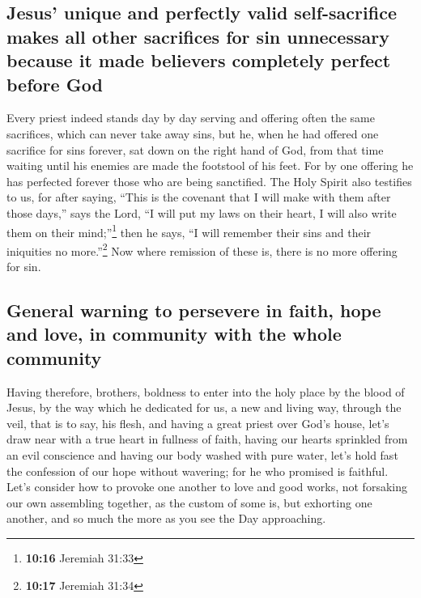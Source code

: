\hypertarget{jesus-unique-and-perfectly-valid-self-sacrifice-makes-all-other-sacrifices-for-sin-unnecessary-because-it-made-believers-completely-perfect-before-god}{%
\subsection{Jesus' unique and perfectly valid self-sacrifice makes all
other sacrifices for sin unnecessary because it made believers
completely perfect before
God}\label{jesus-unique-and-perfectly-valid-self-sacrifice-makes-all-other-sacrifices-for-sin-unnecessary-because-it-made-believers-completely-perfect-before-god}}

 Every priest indeed stands day by day serving and
offering often the same sacrifices, which can never take away sins,
 but he, when he had offered one sacrifice for sins
forever, sat down on the right hand of God,  from that
time waiting until his enemies are made the footstool of his feet.
 For by one offering he has perfected forever those who
are being sanctified.  The Holy Spirit also testifies to
us, for after saying,  ``This is the covenant that I will
make with them after those days,'' says the Lord, ``I will put my laws
on their heart, I will also write them on their mind;''\footnote{\textbf{10:16}
  Jeremiah 31:33} then he says,  ``I will remember their
sins and their iniquities no more.''\footnote{\textbf{10:17} Jeremiah
  31:34}  Now where remission of these is, there is no
more offering for sin.

\hypertarget{general-warning-to-persevere-in-faith-hope-and-love-in-community-with-the-whole-community}{%
\subsection{General warning to persevere in faith, hope and love, in
community with the whole
community}\label{general-warning-to-persevere-in-faith-hope-and-love-in-community-with-the-whole-community}}

 Having therefore, brothers, boldness to enter into the
holy place by the blood of Jesus,  by the way which he
dedicated for us, a new and living way, through the veil, that is to
say, his flesh,  and having a great priest over God's
house,  let's draw near with a true heart in fullness of
faith, having our hearts sprinkled from an evil conscience and having
our body washed with pure water,  let's hold fast the
confession of our hope without wavering; for he who promised is
faithful.  Let's consider how to provoke one another to
love and good works,  not forsaking our own assembling
together, as the custom of some is, but exhorting one another, and so
much the more as you see the Day approaching.

